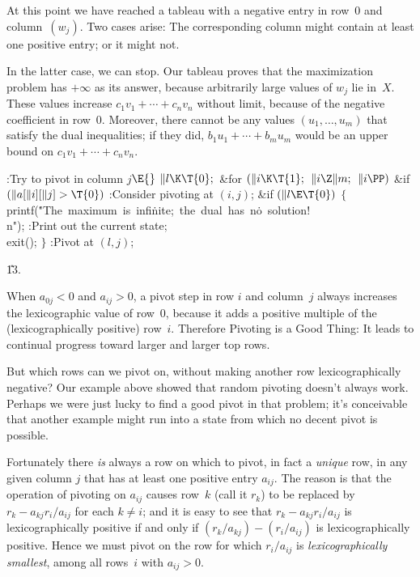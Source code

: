 At this point we have reached a tableau with a negative entry in row~0
and column~$(w_j)$. Two cases arise: The corresponding column might
contain at least one positive entry; or it might not.

In the latter case, we can stop. Our tableau proves that the maximization
problem has $+\infty$ as its answer, because arbitrarily large values
of $w_j$ lie in~$X$. These values increase $c_1v_1+\cdots+c_nv_n$ without
limit, because of the negative coefficient in row~0. Moreover, there
cannot be any values $(u_1,\ldots,u_m)$ that satisfy the dual inequalities;
if they did, $b_1u_1+\cdots+b_mu_m$ would be an upper bound on
$c_1v_1+\cdots+c_nv_n$.

\Y\B\4:Try to pivot in column $j$\X${}\E{}$\6
$\|l\K\T{0};{}$\6
\&{for} ${}(\|i\K\T{1};{}$ ${}\|i\Z\|m;{}$ ${}\|i\PP){}$\1\6
\&{if} ${}(\|a[\|i][\|j]>\T{0}){}$\1\5
:Consider pivoting at $(i,j)$\X;\2\2\6
\&{if} ${}(\|l\E\T{0}){}$\5
${}\{{}$\1\6
\\{printf}(\.{"The\ maximum\ is\ infi}\)\.{nite;\ the\ dual\ has\ n}\)\.{o\
solution!\\n"});\6
:Print out the current state\X;\6
\\{exit}();\6
\4${}\}{}$\2\6
:Pivot at $(l,j)$\X;\par
\U13.\fi

When $a_{0j}<0$ and $a_{ij}>0$, a pivot step in row $i$ and column~$j$
always increases the lexicographic value of row~0, because it adds a positive
multiple of the (lexicographically positive) row~$i$. Therefore Pivoting
is a Good Thing: It leads to continual progress toward larger and larger
top rows.

But which rows can we pivot on, without making another row lexicographically
negative? Our example above showed that random pivoting doesn't always work.
Perhaps we were just lucky to find a good pivot in that problem;
it's conceivable that another example might run into a state from which
no decent pivot is possible.

Fortunately there {\it is\/} always a row on which to pivot, in fact
a {\it unique\/} row, in any
given column $j$ that has at least one positive entry $a_{ij}$.
The reason is that the operation
of pivoting on $a_{ij}$ causes row~$k$ (call it $r_k$) to be
replaced by $r_k-a_{kj}r_i/a_{ij}$ for each $k\ne i$;
and it is easy to see
that $r_k-a_{kj}r_i/a_{ij}$ is lexicographically positive if and only
if $(r_k/a_{kj})-(r_i/a_{ij})$ is lexicographically positive.
Hence we must pivot on the row for which $r_i/a_{ij}$ is {\it lexicographically
smallest}, among all rows~$i$ with $a_{ij}>0$.

